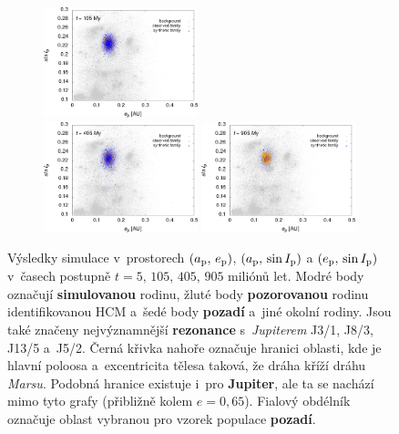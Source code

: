 \documentclass{beamer}
\newlength{\vyska}
\newlength{\vyskaB}
\newlength{\main}
\begin{document}
\begin{frame}
\begin{columns}[t]
\begin{column}{\main}
\begin{tcolorbox}[title=Výsledky\phantom{Úy},height=\vyskaB]
\begin{figure}[t]
\begin{subfigure}[t]{0.33\textwidth}
			\includegraphics[width=0.49\textwidth]{../obr/ei_105t_trans.png}\\
			\includegraphics[width=0.49\textwidth]{../obr/ei_405t_trans.png}
			\includegraphics[width=0.49\textwidth]{../obr/ei_905t_trans.png}
		\end{subfigure}
			\caption{Výsledky simulace v~prostorech $(a_{\rm p},\,e_{\rm p})$, $(a_{\rm p},\,\sin I_{\rm p})$ a  $(e_{\rm p},\,\sin I_{\rm p})$ v~časech postupně $t=5,\,105,\,405,\,905$ miliónů let. Modré body označují \textbf{simulovanou} rodinu, žluté body \textbf{pozorovanou} rodinu identifikovanou HCM a~šedé body \textbf{pozadí} a~jiné okolní rodiny. Jsou také značeny nejvýznamnější \textbf{rezonance} s~\textit{Jupiterem} J3/1, J8/3, J13/5 a~J5/2. Černá křivka nahoře označuje hranici oblasti, kde je hlavní poloosa a~excentricita tělesa taková, že dráha kříží dráhu \textit{Marsu}. Podobná hranice existuje i~pro \textbf{Jupiter}, ale ta se nachází mimo tyto grafy (přibližně kolem $e=0,65$). Fialový obdélník označuje oblast vybranou pro vzorek populace \textbf{pozadí}.} \label{fig:ae_sim}
	\end{figure}


\end{tcolorbox}
\end{column}
\end{columns}
\end{frame}
\end{document}
